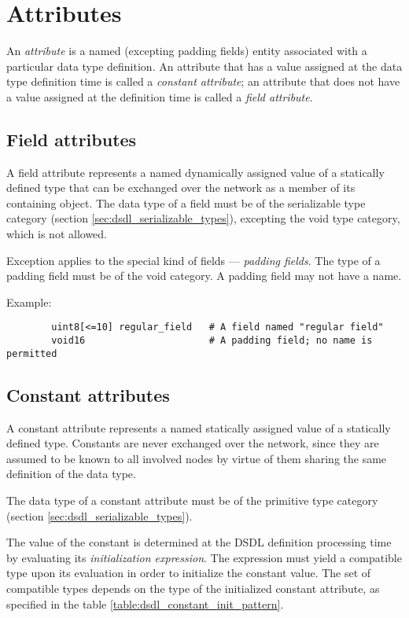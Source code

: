\section{Attributes}\label{sec:dsdl_attributes}

An \emph{attribute} is a named (excepting padding fields) entity associated with a particular data type definition.
An attribute that has a value assigned at the data type definition time is called a \emph{constant attribute};
an attribute that does not have a value assigned at the definition time is called a \emph{field attribute}.

\subsection{Field attributes}

A field attribute represents a named dynamically assigned value of a statically defined type
that can be exchanged over the network as a member of its containing object.
The data type of a field must be of the serializable type category (section \ref{sec:dsdl_serializable_types}),
excepting the void type category, which is not allowed.

Exception applies to the special kind of fields --- \emph{padding fields}.
The type of a padding field must be of the void category.
A padding field may not have a name.

\begin{remark}
    Example:
    \begin{verbatim}
        uint8[<=10] regular_field   # A field named "regular field"
        void16                      # A padding field; no name is permitted
    \end{verbatim}
\end{remark}

\subsection{Constant attributes}

A constant attribute represents a named statically assigned value of a statically defined type.
Constants are never exchanged over the network, since they are assumed to be known to all involved nodes
by virtue of them sharing the same definition of the data type.

The data type of a constant attribute must be of the primitive type category
(section \ref{sec:dsdl_serializable_types}).

The value of the constant is determined at the DSDL definition processing time by evaluating its
\emph{initialization expression}.
The expression must yield a compatible type upon its evaluation in order to initialize the constant value.
The set of compatible types depends on the type of the initialized constant attribute,
as specified in the table \ref{table:dsdl_constant_init_pattern}.

